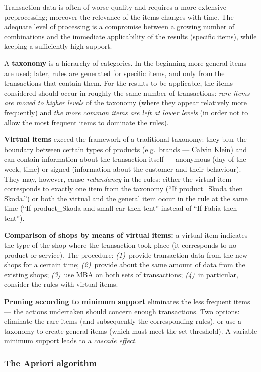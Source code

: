 \documentclass[11pt,a4paper]{article}
\theoremstyle{definition}
\providecommand{\uv}[1]{``#1''}
\begin{document}
Transaction data is often of worse quality and requires a more extensive preprocessing; moreover
the relevance of the items changes with time. The adequate level of processing is a compromise
between a growing number of combinations and the immediate applicability of the results (specific
items), while keeping a sufficiently high support.

A \textbf{taxonomy} is a hierarchy of categories. In the beginning more general items are used;
later, rules are generated for specific items, and only from the transactions that contain them.
For the results to be applicable, the items considered should occur in roughly the same number of
transactions: \emph{rare items are moved to higher levels} of the taxonomy (where they appear
relatively more frequently) and \emph{the more common items are left at lower levels} (in order
not to allow the most frequent items to dominate the rules).

\textbf{Virtual items} exceed the framework of a traditional taxonomy: they blur the boundary
between certain types of products (e.g.\ brands --- Calvin Klein) and can contain information
about the transaction itself --- anonymous (day of the week, time) or signed (information about
the customer and their behaviour). They may, however, cause \emph{redundancy} in the rules:
either the virtual item corresponds to exactly one item from the taxonomy (\uv{If product\_Skoda
then Skoda.}) or both the virtual and the general item occur in the rule at the same time
(\uv{If product\_Skoda and small car then tent} instead of \uv{If Fabia then tent}).

\textbf{Comparison of shops by means of virtual items:} a virtual item indicates the type of the
shop where the transaction took place (it corresponds to no product or service). The procedure:
\emph{(1)}~provide transaction data from the new shops for a certain time; \emph{(2)}~provide
about the same amount of data from the existing shops; \emph{(3)}~use MBA on both sets of
transactions; \emph{(4)}~in particular, consider the rules with virtual items.

\textbf{Pruning according to minimum support} eliminates the less frequent items --- the actions
undertaken should concern enough transactions. Two options: eliminate the rare items (and
subsequently the corresponding rules), or use a taxonomy to create general items (which must meet
the set threshold). A variable minimum support leads to a \emph{cascade effect}.

\subsubsection{The Apriori algorithm}
\end{document}
